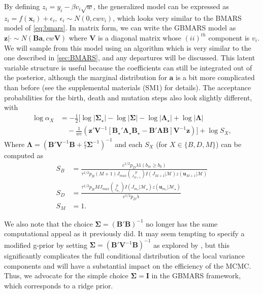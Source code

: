 \documentclass{article} %
\begin{document}
By defining $z_i = y_i - \beta v_i\sqrt w$, the generalized model can be expressed as $z_i = f(\bm x_i) + \epsilon_i, \ \epsilon_i \sim N(0, cwv_i)$, which looks very similar to the BMARS model of \cref{eq:bmars}. In matrix form, we can write the GBMARS model as $\bm z|\cdot \sim N\left(\bm B \bm a, cw\bm V\right)$ where $\bm V$ is a diagonal matrix whose $(ii)^{th}$ component is $v_i$. We will sample from this model using an algorithm which is very similar to the one described in \cref{sec:BMARS}, and any departures will be discussed. This latent variable structure is useful because the coefficients can still be integrated out of the posterior, although the marginal distribution for $\bm a$ is a bit more complicated than before (see the supplemental materials (SM1) for details). The acceptance probabilities for the birth, death and mutation steps also look slightly different, with
\begin{equation}
\label{eq:accept_gen2}
\begin{aligned}
\log\alpha_X &= -\frac{1}{2}\Bigg[\log|\bm\Sigma_\star| - \log|\bm\Sigma| - \log|\bm\Lambda_\star| + \log|\bm\Lambda| \\
& \quad - \frac{1}{wc}\left( \bm z'\bm V^{-1}\left[\bm B_\star'\bm\Lambda_\star \bm B_\star - \bm B' \bm\Lambda \bm B\right]\bm V^{-1} \bm z\right)\Bigg]  + \log S_X,
 \end{aligned}
\end{equation}
Where  $\bm\Lambda = \left(\bm B'\bm V^{-1}\bm B + \frac{c}{\tau}\bm\Sigma^{-1}\right)^{-1}$ and each $S_X$ (for $X \in \{B, D, M\}$) can be computed as
\begin{equation}
\label{eq:accept_genS}
\begin{aligned}
S_B &= \frac{c^{1/2}p_D\lambda 1(b_m \geq b_0)}{\tau^{1/2}p_B(M+1)J_{max}\binom{p}{J_{M+1}}I(J_{M+1}|\mathcal M)z(\bm u_{M+1}|\mathcal M)} \\[1.1ex]
S_D &= \frac{\tau^{1/2}p_BMJ_{max}\binom{p}{J_{m_\star}}I(J_{m_\star}|\mathcal M_\star)z(\bm u_{m_\star}|\mathcal M_\star)}{c^{1/2}p_D\lambda} \\[1.1ex]
S_M &= 1.
 \end{aligned}
\end{equation}

We also note that the choice $\bm\Sigma = (\bm B'\bm B)^{-1}$ no longer has the same computational appeal as it previously did. It may seem tempting to specify a modified g-prior by setting $\bm\Sigma = (\bm B'\bm V^{-1}\bm B)^{-1}$ as explored by \cite{alhamzawi2015}, but this significantly complicates the full conditional distribution of the local variance components and will have a substantial impact on the efficiency of the MCMC. Thus, we advocate for the simple choice $\bm\Sigma = \bm I$ in the GBMARS framework, which corresponds to a ridge prior. 
\end{document}
